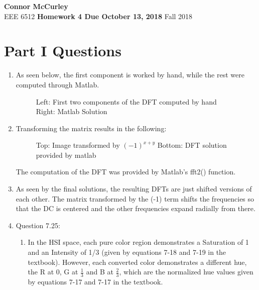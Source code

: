 \documentclass{article}[12 pt]
\begin{document}
	
\begin{center}
	\textbf{\Large Connor McCurley} \\
	EEE 6512 \qquad \textbf{\large Homework 4 Due October 13, 2018} \qquad Fall 2018 
\end{center}

\section*{Part I Questions}

\begin{enumerate}
\item As seen below, the first component is worked by hand, while the rest were computed through Matlab.

\begin{figure}[h!]
\captionsetup[subfloat]{labelformat=empty}
\centering
{}
\newline
{}
\caption{Left: First two components of the DFT computed by hand Right: Matlab Solution}
\end{figure}

\newpage
\item Transforming the matrix results in the following:

\begin{figure}[H]
\captionsetup[subfloat]{labelformat=empty}
\centering
{}
\newline
{}
\caption{Top: Image transformed by $(-1)^{x+y}$ Bottom: DFT solution provided by matlab}
\end{figure}

The computation of the DFT was provided by Matlab's fft2() function.

\item As seen by the final solutions, the resulting DFTs are just shifted versions of each other.  The matrix transformed by the (-1) term shifts the frequencies so that the DC is centered and the other frequencies expand radially from there.

\item Question 7.25:
	\begin{enumerate}[label=\alph*]
		\item In the HSI space, each pure color region demonstrates a Saturation of 1 and an Intensity of 1/3 (given by equations 7-18 and 7-19 in the textbook).  However, each converted color demonstrates a different hue, the R at 0, G at $\frac{1}{3}$ and B at $\frac{2}{3}$, which are the normalized hue values given by equations 7-17 and 7-17 in the textbook.


\end{enumerate}
\end{enumerate}
\end{document}
